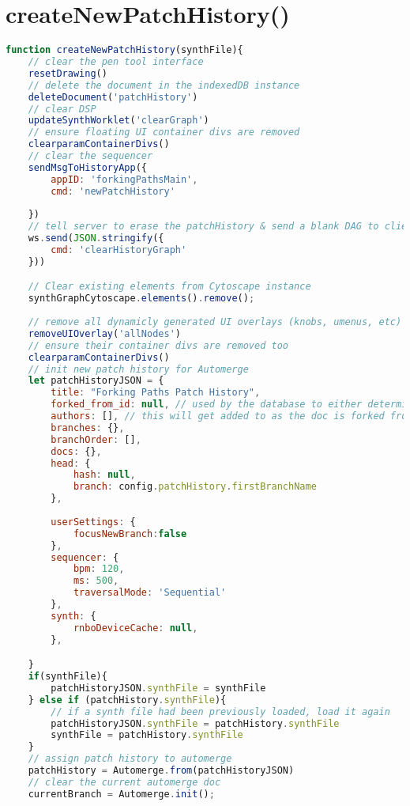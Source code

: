 \section{createNewPatchHistory()}

\begin{lstlisting}[language=JavaScript, caption={Clears the patchHistory Automerge document, clears DSP and Cytoscape.js states, reloads the current .fpSynth file as the first change in the patchHistory and redraws UI elements}, label={lst:createNewPatchHistory}]
function createNewPatchHistory(synthFile){
    // clear the pen tool interface
    resetDrawing()
    // delete the document in the indexedDB instance
    deleteDocument('patchHistory')
    // clear DSP
    updateSynthWorklet('clearGraph')
    // ensure floating UI container divs are removed
    clearparamContainerDivs()
    // clear the sequencer
    sendMsgToHistoryApp({
        appID: 'forkingPathsMain',
        cmd: 'newPatchHistory'
            
    })
    // tell server to erase the patchHistory & send a blank DAG to client(s)
    ws.send(JSON.stringify({
        cmd: 'clearHistoryGraph'
    }))

    // Clear existing elements from Cytoscape instance
    synthGraphCytoscape.elements().remove();
    
    // remove all dynamicly generated UI overlays (knobs, umenus, etc)
    removeUIOverlay('allNodes')
    // ensure their container divs are removed too
    clearparamContainerDivs()
    // init new patch history for Automerge
    let patchHistoryJSON = {
        title: "Forking Paths Patch History",
        forked_from_id: null, // used by the database to either determine this as the root of a tree of patch histories, or a fork from a stored history 
        authors: [], // this will get added to as the doc is forked from the database
        branches: {},
        branchOrder: [],
        docs: {},
        head: {
            hash: null,
            branch: config.patchHistory.firstBranchName
        },
        
        userSettings: {
            focusNewBranch:false 
        },
        sequencer: {
            bpm: 120,
            ms: 500,
            traversalMode: 'Sequential'
        },
        synth: {
            rnboDeviceCache: null,
        },

    }
    if(synthFile){
        patchHistoryJSON.synthFile = synthFile
    } else if (patchHistory.synthFile){
        // if a synth file had been previously loaded, load it again
        patchHistoryJSON.synthFile = patchHistory.synthFile
        synthFile = patchHistory.synthFile
    }
    // assign patch history to automerge
    patchHistory = Automerge.from(patchHistoryJSON)
    // clear the current automerge doc
    currentBranch = Automerge.init();


\end{lstlisting}
